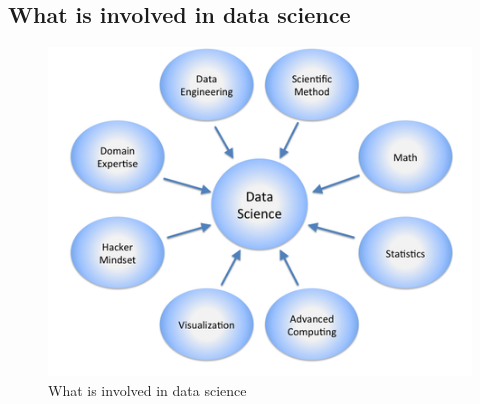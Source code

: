 \documentclass[a4paper,12pt,oneside]{report}
\begin{document}
{\subsection{What is involved in data science}
\begin{figure}[h!]
\centering
\includegraphics[width=1\textwidth]{Capture1}
\caption{What is involved in data science}
\end{figure}
}
\end{document}
